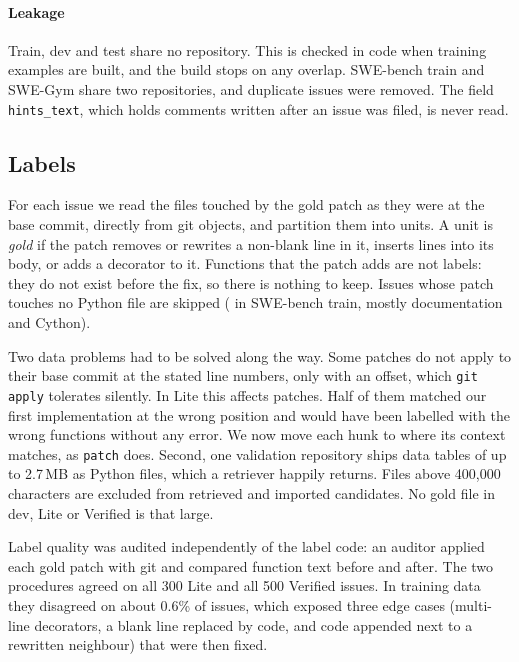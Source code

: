 \paragraph{Leakage} Train, dev and test share no repository. This is checked in code when training examples are built, and the build stops on any overlap. SWE-bench train and SWE-Gym share two repositories, and  duplicate issues were removed. The field \texttt{hints\_text}, which holds comments written after an issue was filed, is never read.

\subsection{Labels}
\label{sec:labels}

For each issue we read the files touched by the gold patch as they were at the base commit, directly from git objects, and partition them into units. A unit is \emph{gold} if the patch removes or rewrites a non-blank line in it, inserts lines into its body, or adds a decorator to it. Functions that the patch adds are not labels: they do not exist before the fix, so there is nothing to keep. Issues whose patch touches no Python file are skipped ( in SWE-bench train, mostly documentation and Cython).

Two data problems had to be solved along the way. Some patches do not apply to their base commit at the stated line numbers, only with an offset, which \texttt{git apply} tolerates silently. In Lite this affects  patches. Half of them matched our first implementation at the wrong position and would have been labelled with the wrong functions without any error. We now move each hunk to where its context matches, as \texttt{patch} does. Second, one validation repository ships data tables of up to 2.7\,MB as Python files, which a retriever happily returns. Files above 400{,}000 characters are excluded from retrieved and imported candidates. No gold file in dev, Lite or Verified is that large.

Label quality was audited independently of the label code: an auditor applied each gold patch with git and compared function text before and after. The two procedures agreed on all 300 Lite and all 500 Verified issues. In training data they disagreed on about 0.6\% of issues, which exposed three edge cases (multi-line decorators, a blank line replaced by code, and code appended next to a rewritten neighbour) that were then fixed.

